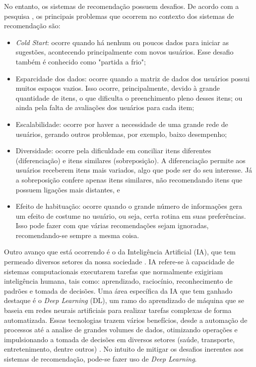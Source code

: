 No entanto, os sistemas de recomendação possuem desafios. De acordo com a pesquisa 
,   
os principais problemas que ocorrem no contexto dos sistemas de recomendação são:
\begin{itemize}
\item \textit{Cold Start}: ocorre quando há nenhum ou poucos dados para iniciar as sugestões, acontecendo principalmente 
com novos usuários. Esse desafio também é conhecido como "partida a frio";
\item Esparcidade dos dados: ocorre quando a matriz de dados dos usuários possui  muitos espaços vazios. Isso ocorre, principalmente,
devido à grande quantidade de itens, o que dificulta o preenchimento pleno desses itens; ou ainda pela falta de avaliações
dos usuários para cada item;
\item Escalabilidade: ocorre por haver a necessidade de uma grande rede de usuários, gerando outros problemas, por exemplo,
baixo desempenho;
\item Diversidade: ocorre pela dificuldade em conciliar itens diferentes (diferenciação) e itens similares (sobreposição). A
diferenciação permite aos usuários receberem itens mais variados, algo que pode ser do seu interesse. Já a sobreposição confere
apenas itens similares, não recomendando itens que possuem ligações mais distantes, e
\item Efeito de habituação: ocorre quando o grande número de informações gera um efeito de costume no usuário, ou seja,
certa rotina em suas preferências. Isso pode fazer com que várias recomendações sejam ignoradas, recomendando-se sempre a mesma
coisa.
\end{itemize}

Outro avanço que está ocorrendo é o da Inteligência Artificial (IA), que tem permeado diversos setores da nossa sociedade \cite{perspectiva-dados-IA-2023}. IA refere-se à capacidade de sistemas computacionais executarem tarefas que 
normalmente exigiriam inteligência humana, tais como: aprendizado, raciocínio, reconhecimento de padrões e tomada de decisões. 
Uma área específica da IA que tem ganhado destaque é o \textit{Deep Learning} (DL), um ramo do aprendizado de 
máquina que se baseia em redes neurais artificiais para realizar tarefas complexas de forma automatizada.
Essas tecnologias trazem vários benefícios, desde a automação de processos até a analise de grandes volumes de dados, 
otimizando operações e impulsionando a tomada de decisões em diversos setores (saúde, transporte, entretenimento, dentre outros)
\cite{Suleimenov}. No intuito de mitigar os desafios inerentes aos sistemas de recomendação, pode-se fazer uso de \textit{Deep Learning}.

